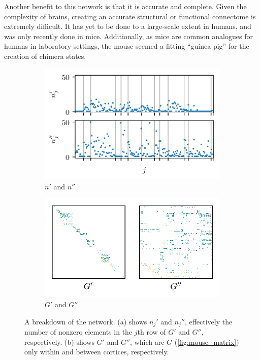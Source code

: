 Another benefit to this network is that it is accurate and complete.
Given the complexity of brains, creating an accurate structural or functional connectome is extremely difficult.
It has yet to be done to a large-scale extent in humans, and was only recently done in mice.
Additionally, as mice are common analogues for humans in laboratory settings, the mouse seemed a fitting ``guinea pig'' for the creation of chimera states.

\begin{figure}[ht]
  \centering
  \begin{subfigure}{0.45\textwidth}
    \centering
    \includegraphics[width=\textwidth]{figure/n_prime}
    \caption{$n'$ and $n''$}
    \label{fig:n_prime}
  \end{subfigure} %
  \begin{subfigure}{0.45\textwidth}
    \centering
    \includegraphics[width=\textwidth]{figure/g_prime}
    \caption{$G'$ and $G''$}
    \label{fig:g_prime}
  \end{subfigure}
  \caption[Network breakdown]{A breakdown of the network.
    (a) shows $n_{j}'$ and $n_{j}''$, effectively the number of nonzero elements in the $j$th row of $G'$ and $G''$, respectively.
    (b) shows $G'$ and $G''$, which are $G$ (\cref{fig:mouse_matrix}) only within and between cortices, respectively.
  }
  \label{fig:network_breakdown}
\end{figure}

